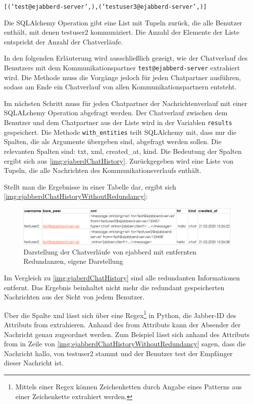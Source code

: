 \documentclass[a4paper,titlepage,halfparskip,12pt]{scrreprt}
\begin{document}
\begin{onehalfspacing}
\texttt{[('test@ejabberd-server',),('testuser3@ejabberd-server',)]}

Die SQLAlchemy Operation gibt eine List mit Tupeln zurück, die alle Benutzer enthält, mit denen testuser2 kommuniziert. Die Anzahl der Elemente der Liste entspricht der Anzahl der Chatverläufe.

In den folgenden Erläuterung wird ausschließlich gezeigt, wie der Chatverlauf des Benutzers mit dem Kommunikationspartner \texttt{test@ejabberd-server} extrahiert wird. Die Methode muss die Vorgänge jedoch für jeden Chatpartner ausführen, sodass am Ende ein Chatverlauf von allen Kommunikationspartnern entsteht.

Im nächsten Schritt muss für jeden Chatpartner der Nachrichtenverlauf mit einer SQLALchemy Operation abgefragt werden. Der Chatverlauf zwischen dem Benutzer und dem Chatpartner aus der Liste wird in der Variablen \texttt{results} gespeichert. Die Methode \texttt{with\_entities} teilt SQLAlchemy mit, dass nur die Spalten, die als Argumente übergeben sind, abgefragt werden sollen. Die relevanten Spalten sind: txt, xml, created\_at, kind. Die Bedeutung der Spalten ergibt sich aus \autoref{img:ejaberdChatHistory}. Zurückgegeben wird eine Liste von Tupeln, die alle Nachrichten des Kommunikationsverlaufs enthält.

Stellt man die Ergebnisse in einer Tabelle dar, ergibt sich \autoref{img:ejabberdChatHistoryWithoutRedundancy}:

\begin{figure}[h]
	\centering
	\includegraphics[width=\textwidth]{images/ejabberdChatHistoryWithoutRedundancy}
	\caption{Darstellung der Chatverläufe von ejabberd mit entfernten Redundanzen, eigene Darstellung}
	\label{img:ejabberdChatHistoryWithoutRedundancy}
\end{figure}

Im Vergleich zu \autoref{img:ejaberdChatHistory} sind alle redundanten Informationen entfernt. Das Ergebnis beinhaltet nicht mehr die redundant gespeicherten Nachrichten aus der Sicht von jedem Benutzer.

Über die Spalte xml lässt sich über eine Regex\footnote{Mittels einer Regex können Zeichenketten durch Angabe eines Patterns aus einer Zeichenkette extrahiert werden.\cite{pythonRegex}} in Python, die Jabber-ID des Attributs from extrahieren. Anhand des from Attributs kann der Absender der Nachricht genau zugeordnet werden. Zum Beispiel lässt sich anhand des Attributs from in Zeile von \autoref{img:ejabberdChatHistoryWithoutRedundancy} sagen, dass die Nachricht \glqq hallo\grqq, von testuser2 stammt und der Benutzer test der Empfänger dieser Nachricht ist.


\end{onehalfspacing}
\end{document}
